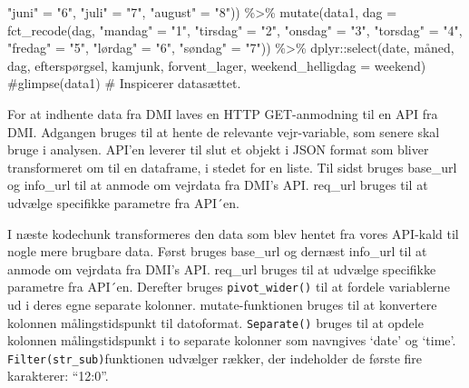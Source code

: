 \documentclass[
  12pt,
  a4paper,
  DIV=11,
  numbers=noendperiod]{scrartcl}
\newenvironment{Shaded}{\begin{snugshade}}{\end{snugshade}}
\newcommand{\AttributeTok}[1]{\textcolor[rgb]{0.40,0.45,0.13}{#1}}
\newcommand{\CommentTok}[1]{\textcolor[rgb]{0.37,0.37,0.37}{#1}}
\newcommand{\FunctionTok}[1]{\textcolor[rgb]{0.28,0.35,0.67}{#1}}
\newcommand{\NormalTok}[1]{\textcolor[rgb]{0.00,0.23,0.31}{#1}}
\newcommand{\OtherTok}[1]{\textcolor[rgb]{0.00,0.23,0.31}{#1}}
\newcommand{\SpecialCharTok}[1]{\textcolor[rgb]{0.37,0.37,0.37}{#1}}
\newcommand{\StringTok}[1]{\textcolor[rgb]{0.13,0.47,0.30}{#1}}
\begin{document}
\begin{Shaded}
\begin{Highlighting}[numbers=left,,]
                                      \StringTok{"juni"} \OtherTok{=} \StringTok{"6"}\NormalTok{, }\StringTok{"juli"} \OtherTok{=} \StringTok{"7"}\NormalTok{,}
                                      \StringTok{"august"} \OtherTok{=} \StringTok{"8"}\NormalTok{)) }\SpecialCharTok{\%\textgreater{}\%}
  \FunctionTok{mutate}\NormalTok{(data1, }\AttributeTok{dag =} \FunctionTok{fct\_recode}\NormalTok{(dag, }\StringTok{"mandag"} \OtherTok{=} \StringTok{"1"}\NormalTok{, }\StringTok{"tirsdag"} \OtherTok{=} \StringTok{"2"}\NormalTok{,}
                                      \StringTok{"onsdag"} \OtherTok{=} \StringTok{"3"}\NormalTok{, }\StringTok{"torsdag"} \OtherTok{=} \StringTok{"4"}\NormalTok{,}
                                      \StringTok{"fredag"} \OtherTok{=} \StringTok{"5"}\NormalTok{, }\StringTok{"lørdag"} \OtherTok{=} \StringTok{"6"}\NormalTok{,}
                                      \StringTok{"søndag"} \OtherTok{=} \StringTok{"7"}\NormalTok{)) }\SpecialCharTok{\%\textgreater{}\%}
\NormalTok{  dplyr}\SpecialCharTok{::}\FunctionTok{select}\NormalTok{(date, måned, dag, efterspørgsel, kamjunk, forvent\_lager,}
  \AttributeTok{weekend\_helligdag =}\NormalTok{ weekend)}
\CommentTok{\#glimpse(data1) \# Inspicerer datasættet.}
\end{Highlighting}
\end{Shaded}

For at indhente data fra DMI laves en HTTP GET-anmodning til en API fra
DMI. Adgangen bruges til at hente de relevante vejr-variable, som senere
skal bruge i analysen. API'en leverer til slut et objekt i JSON format
som bliver transformeret om til en dataframe, i stedet for en liste. Til
sidst bruges base\_url og info\_url til at anmode om vejrdata fra DMI's
API. req\_url bruges til at udvælge specifikke parametre fra API´en.

I næste kodechunk transformeres den data som blev hentet fra vores
API-kald til nogle mere brugbare data. Først bruges base\_url og dernæst
info\_url til at anmode om vejrdata fra DMI's API. req\_url bruges til
at udvælge specifikke parametre fra API´en. Derefter bruges
\texttt{pivot\_wider()} til at fordele variablerne ud i deres egne
separate kolonner. mutate-funktionen bruges til at konvertere kolonnen
målingstidspunkt til datoformat. \texttt{Separate()} bruges til at
opdele kolonnen målingstidspunkt i to separate kolonner som navngives
`date' og `time'. \texttt{Filter(str\_sub)}funktionen udvælger rækker,
der indeholder de første fire karakterer: ``12:0''.
\end{document}

